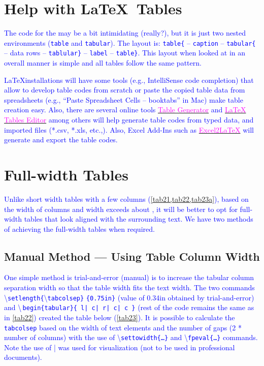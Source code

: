 \documentclass[phd]{ndsu-thesis-2022}
\newcommand\italk[1]{\textcolor{blue}{#1}}  %
\newcommand\cmd[1]{\textbackslash\texttt{#1}}  %
\newcommand\vb[1]{\textcolor{blue}{\texttt{#1}}}%
\newcommand\vbc[1]{\textcolor{blue}{\textbackslash\,\texttt{#1}}}%
\begin{document}
\section{Help with \LaTeX\ Tables}
\italk{The code for the  may be a bit intimidating (really?), but it is just two nested environments (\vb{table} and \vb{tabular}). The layout is: \vb{table\{} -- \vb{caption} -- \vb{tabular\{} -- data rows -- \vb{tablular\}} -- \vb{label} -- \vb{table\}}. This layout when looked at in an overall manner is simple and all tables follow the same pattern.}  

\italk{\LaTeX installations will have some tools (e.g., IntelliSense code completion) that allow to develop table codes from scratch or paste the copied table data from spreadsheets (e.g., ``Paste Spreadsheet Cells -- booktabs'' in Mac) make table creation easy. Also, there are several online tools \href{https://www.tablesgenerator.com}{\textcolor{magenta}{Table Generator}} and \href{https://www.latex-tables.com}{\textcolor{magenta}{LaTeX Tables Editor}} among others will help generate table codes from typed data, and imported files (*.csv, *.xls, etc.,). Also, Excel Add-Ins such as \href{https://ctan.org/tex-archive/support/excel2latex?lang=en}{\textcolor{magenta}{Excel2\LaTeX}} will generate and export the table codes. 
}

\section{Full-width Tables}
\italk{Unlike short width tables with a few columns (\cref{tab21,tab22,tab23a}), based on the width of columns and width exceeds about \pr{60}, it will be better to opt for full-width tables that look aligned with the surrounding text. We have two methods of achieving the full-width tables when required.}

\subsection{Manual Method --- Using Table Column Width}
\italk{One simple method is trial-and-error (manual) is to increase the tabular column separation width so that the table width fits the text width. The two commands \cmd{setlength\{}\cmd{tabcolsep\}} \vb{\{0.75in\}} (value of 0.34in obtained by trial-and-error) and \vbc{begin\{tabular\}\{ l|   c|   r|   c|   c \}} (rest of the code remains the same as in \cref{tab22}) created the table below (\cref{tab23}). It is possible to calculate the \vb{tabcolsep} based on the width of text elements and the number of gaps (2 * number of columns) with the use of \cmd{settowidth\{\ldots\}} and \cmd{fpeval\{\ldots\}} commands. Note the use of | was used for visualization (not to be used in professional documents).} 
\end{document}
